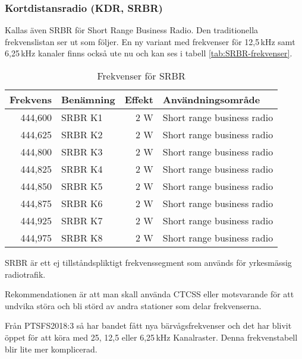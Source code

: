 \clearpage
\subsubsection{Kortdistansradio (KDR, SRBR)}

Kallas även SRBR för Short Range Business Radio. 
Den traditionella frekvenslistan ser ut som följer. En ny variant med frekvenser för 12,5\,kHz samt 6,25\,kHz kanaler finns också ute nu och kan ses i tabell \ref{tab:SRBR-frekvenser}.

\begin{table}[h]
	\centering
\begin{tabular}{rlrl}
\textbf{Frekvens} & \textbf{Benämning} & \textbf{Effekt} & \textbf{Användningsområde} \\ \hline
444,600 & SRBR K1            & 2 W             & Short range business radio \\
444,625 & SRBR K2            & 2 W             & Short range business radio \\
444,800 & SRBR K3            & 2 W             & Short range business radio \\
444,825 & SRBR K4            & 2 W             & Short range business radio \\
444,850 & SRBR K5            & 2 W             & Short range business radio \\
444,875 & SRBR K6            & 2 W             & Short range business radio \\
444,925 & SRBR K7            & 2 W             & Short range business radio \\
444,975 & SRBR K8            & 2 W             & Short range business radio
\end{tabular}
\caption{Frekvenser för SRBR}
\end{table}	

SRBR är ett ej tillståndspliktigt frekvenssegment som används för yrkesmässig radiotrafik.

Rekommendationen är att man skall använda CTCSS eller motsvarande för att undvika störa och bli störd av andra stationer som delar frekvenserna.

Från PTSFS2018:3 så har bandet fått nya bärvågsfrekvenser och det har blivit öppet för att köra med 25, 12,5 eller 6,25\,kHz Kanalraster. Denna frekvenstabell blir lite mer komplicerad.

